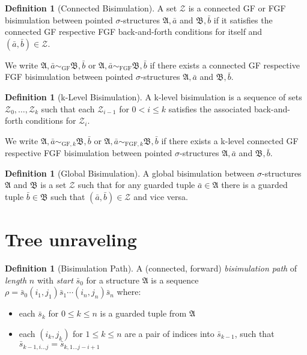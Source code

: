 \documentclass{scrartcl}
\theoremstyle{definition}
\newtheorem{definition}[theorem]{Definition}
\newcommand{\struct}[1]{$\mathfrak{#1}$}
\begin{document}
\begin{definition}[Connected Bisimulation]
A set $\mathcal{Z}$ is a connected GF or FGF bisimulation between pointed $\sigma$-structures $\mathfrak{A}, \bar{a}$ and $\mathfrak{B}, \bar{b}$ if it satisfies the connected GF respective FGF back-and-forth conditions for itself and $(\bar{a}, \bar{b}) \in \mathcal{Z}$.
\end{definition}

We write $\mathfrak{A}, \bar{a} \sim_{\textrm{GF}} \mathfrak{B}, \bar{b}$ or $\mathfrak{A}, \bar{a} \sim_{\textrm{FGF}} \mathfrak{B}, \bar{b}$ if there exists a connected GF respective FGF bisimulation between pointed $\sigma$-structures $\mathfrak{A}, \bar{a}$ and $\mathfrak{B}, \bar{b}$.

\begin{definition}[k-Level Bisimulation]
A k-level bisimulation is a sequence of sets $\mathcal{Z}_0, \ldots, \mathcal{Z}_k$ such that each $\mathcal{Z}_{i - 1}$ for $0 < i \le k$ satisfies the associated back-and-forth conditions for $\mathcal{Z}_i$.
\end{definition}

We write $\mathfrak{A}, \bar{a} \sim_{\textrm{GF}, k} \mathfrak{B}, \bar{b}$ or $\mathfrak{A}, \bar{a} \sim_{\textrm{FGF}, k} \mathfrak{B}, \bar{b}$ if there exists a k-level connected GF respective FGF bisimulation between pointed $\sigma$-structures $\mathfrak{A}, \bar{a}$ and $\mathfrak{B}, \bar{b}$.

\begin{definition}[Global Bisimulation]
A global bisimulation between $\sigma$-structures $\mathfrak{A}$ and $\mathfrak{B}$ is a set $\mathcal{Z}$ such that for any guarded tuple $\bar{a} \in \mathfrak{A}$ there is a guarded tuple $\bar{b} \in \mathfrak{B}$ such that $(\bar{a}, \bar{b}) \in \mathcal{Z}$ and vice versa.
\end{definition}

\pagebreak

\section{Tree unraveling}

\begin{definition}[Bisimulation Path]\label{def:bisim-path}
  A (connected, forward) \emph{bisimulation path} of \emph{length} $n$ with \emph{start} $\bar{s}_{0}$ for a structure \struct{A} is a sequence $\rho = \bar{s}_{0}(i_{1}, j_{1})\bar{s}_{1}\cdots{}(i_{n}, j_{n})\bar{s}_{n}$ where:
  \begin{itemize}
    \item each $\bar{s}_{k}$ for $0 \le k \le n$ is a guarded tuple from \struct{A}
    \item each $(i_{k}, j_{k})$ for $1 \le k \le n$ are a pair of indices into $\bar{s}_{k-1}$, such that $\bar{s}_{k-1,i\ldots{}j} = \bar{s}_{k,1\ldots{j-i+1}}$
  \end{itemize}
\end{definition}
\end{document}

